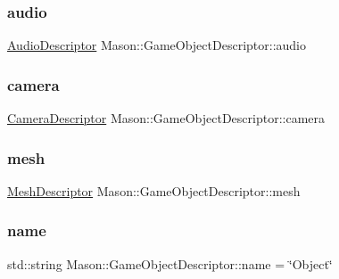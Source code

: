 \subsubsection{\texorpdfstring{audio}{audio}}
{\footnotesize\ttfamily \hyperlink{class_mason_1_1_audio_descriptor}{Audio\+Descriptor} Mason\+::\+Game\+Object\+Descriptor\+::audio}

\hypertarget{class_mason_1_1_game_object_descriptor_a9b2710a89f6a1bb223594a2762340414}{}\label{class_mason_1_1_game_object_descriptor_a9b2710a89f6a1bb223594a2762340414} 
\subsubsection{\texorpdfstring{camera}{camera}}
{\footnotesize\ttfamily \hyperlink{class_mason_1_1_camera_descriptor}{Camera\+Descriptor} Mason\+::\+Game\+Object\+Descriptor\+::camera}

\hypertarget{class_mason_1_1_game_object_descriptor_aa35f5149d8d6fe9670f6b3bac1c9d0a2}{}\label{class_mason_1_1_game_object_descriptor_aa35f5149d8d6fe9670f6b3bac1c9d0a2} 
\subsubsection{\texorpdfstring{mesh}{mesh}}
{\footnotesize\ttfamily \hyperlink{class_mason_1_1_mesh_descriptor}{Mesh\+Descriptor} Mason\+::\+Game\+Object\+Descriptor\+::mesh}

\hypertarget{class_mason_1_1_game_object_descriptor_aea3fddf12ef08c91e1f5e422c7521e18}{}\label{class_mason_1_1_game_object_descriptor_aea3fddf12ef08c91e1f5e422c7521e18} 
\subsubsection{\texorpdfstring{name}{name}}
{\footnotesize\ttfamily std\+::string Mason\+::\+Game\+Object\+Descriptor\+::name = \char`\"{}Object\char`\"{}}

\hypertarget{class_mason_1_1_game_object_descriptor_aa51c7f6f6a4cb0720c352cd504d4593c}{}\label{class_mason_1_1_game_object_descriptor_aa51c7f6f6a4cb0720c352cd504d4593c} 

